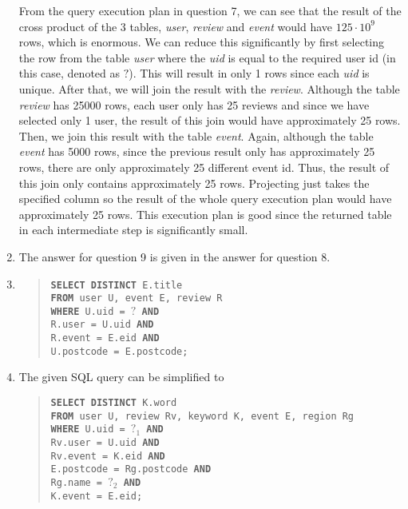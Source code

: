 \documentclass{article}
\newcommand{\SQL}[1]{\texttt{#1}}
\newcommand{\SQLK}[1]{\texttt{\bf #1}}
\begin{document}
\begin{enumerate}
    From the query execution plan in question 7, we can see that the result of
    the cross product of the 3 tables, \emph{user}, \emph{review} and
    \emph{event} would have $125 \cdot 10^9$ rows, which is enormous. We can
    reduce this significantly by first selecting the row from the table
    \emph{user} where the \emph{uid} is equal to the required user id (in this
    case, denoted as $?$). This will result in only 1 rows since each \emph{uid}
    is unique. After that, we will join the result with the \emph{review}.
    Although the table \emph{review} has 25000 rows, each user only has 25
    reviews and since we have selected only 1 user, the result of this join
    would have approximately 25 rows. Then, we join this result with the table
    \emph{event}. Again, although the table \emph{event} has 5000 rows, since
    the previous result only has approximately 25 rows, there are only
    approximately 25 different event id. Thus, the result of this join only
    contains approximately 25 rows. Projecting just takes the specified column
    so the result of the whole query execution plan would have approximately 25
    rows. This execution plan is good since the returned table in each
    intermediate step is significantly small.

  \item The answer for question 9 is given in the answer for question 8.

  \item
    \begin{quote}
      \SQL{\SQLK{SELECT} \SQLK{DISTINCT} E.title\\
      \SQLK{FROM} user U, event E, review R\\
      \SQLK{WHERE} U.uid = $?$ \SQLK{AND}\\
      \phantom{\SQLK{WHERE}} R.user = U.uid \SQLK{AND}\\
      \phantom{\SQLK{WHERE}} R.event = E.eid \SQLK{AND}\\
      \phantom{\SQLK{WHERE}} U.postcode = E.postcode;} \\
    \end{quote}

  \item The given SQL query can be simplified to
    \begin{quote}
      \SQL{\SQLK{SELECT} \SQLK{DISTINCT} K.word\\
      \SQLK{FROM} user U, review Rv, keyword K, event E, region Rg\\
      \SQLK{WHERE} U.uid = $?_1$ \SQLK{AND}\\
      \phantom{\SQLK{WHERE}} Rv.user = U.uid \SQLK{AND}\\
      \phantom{\SQLK{WHERE}} Rv.event = K.eid \SQLK{AND}\\
      \phantom{\SQLK{WHERE}} E.postcode = Rg.postcode \SQLK{AND}\\
      \phantom{\SQLK{WHERE}} Rg.name = $?_2$ \SQLK{AND} \\
      \phantom{\SQLK{WHERE}} K.event = E.eid;}
    \end{quote}


\end{enumerate}
\end{document}
